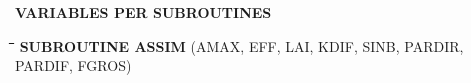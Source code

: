 \documentclass[11pt]{article}
\begin{document}
{\bf {\LARGE VARIABLES PER SUBROUTINES}}

\nwln
\begin{tabbing}
\hspace{1.27cm}\=\hspace{1.27cm}\=\hspace{1.27cm}\=\hspace{1.27cm}\=%
\hspace{1.27cm}\=\hspace{1.27cm}\=\hspace{1.27cm}\=\hspace{1.27cm}\=%
\hspace{1.27cm}\=\hspace{1.27cm}\=\kill
{\bf SUBROUTINE ASSIM}\> \> \> (AMAX, EFF, LAI, KDIF, SINB, PARDIR, PARDIF, FGROS)
\end{tabbing}
\nwln
\end{document}
